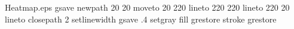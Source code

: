 %
%
%
%
%
\begin{filecontents*}{Heatmap.eps}
gsave
newpath
  20 20 moveto
  20 220 lineto
  220 220 lineto
  220 20 lineto
closepath
2 setlinewidth
gsave
  .4 setgray fill
grestore
stroke
grestore
\end{filecontents*}
%
\RequirePackage{fix-cm}
%
\documentclass[twocolumn,natbib]{svjour3}          %
%
\smartqed  %
%
\usepackage{graphicx}
\usepackage{amssymb}
\usepackage{amsmath}
\usepackage{algorithm}
\usepackage{url}
%
%
%
\newcommand{\T}{{ \top}} %
\newcommand{\ua}{{\bf a}} %
\newcommand{\ub}{{\bf b}} %
\newcommand{\uI}{{\bf I}} %
\newcommand{\uH}{{\bf H}} %
\newcommand{\uX}{{\bf X}} %
\newcommand{\ux}{{\bf x}} %
\newcommand{\uy}{{\bf y}} %
\newcommand{\ud}{{\bf d}} %
\newcommand{\uv}{{\bf v}} %
\newcommand{\uV}{{\bf V}} %
\newcommand{\uu}{{\bf u}} %
\newcommand{\um}{{\bf m}} %
\newcommand{\0}{{\boldsymbol 0}} %
\newcommand{\1}{{\boldsymbol 1}} %
\newcommand{\ubeta}{{\boldsymbol \beta}} %
\newcommand{\ueta}{{\boldsymbol \eta}} %
\newcommand{\umu}{{\boldsymbol \mu}} %
\newcommand{\bg}{{\boldsymbol \gamma}} %
\newcommand{\uepsilon}{{\boldsymbol \epsilon}} %
\newcommand{\uSigma}{{\boldsymbol \Sigma}} %
\newcommand{\uPsi}{{\boldsymbol \Psi}}
\newcommand{\diag}{{\rm diag}} %
%
%


